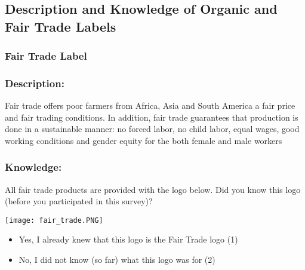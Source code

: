 \documentclass[sustainability,article,accept,moreauthors,pdftex,10pt,a4paper]{Definitions/mdpi}
\theoremstyle{mdpi}
\newcounter{ex}
\newcounter{re}
\theoremstyle{mdpidefinition}
\begin{document}
{
\appendix


\makeatletter
{}
\renewcommand{\thetable}{A\@arabic\c@table}
\setcounter{table}{0}
\renewcommand{\thefigure}{A\@arabic\c@figure}
\setcounter{figure}{0}
\makeatother
\section{\label{aaa}}
\subsection{Description and Knowledge of Organic and Fair Trade Labels }  %
\unskip
{}
\subsubsection{Fair Trade Label}
\unskip
\subsubsection*{Description:}
\par{Fair trade offers poor farmers from Africa, Asia and South America a fair price and fair trading conditions. In addition, fair trade guarantees that production is done in a sustainable manner: no forced labor, no child labor, equal wages, good working conditions and gender equity for the both female and male workers}
\subsubsection*{Knowledge:}
\par{All fair trade products are provided with the logo below. Did you know this logo (before you participated in this survey)?

\begin{minipage}{0.5\textwidth}
\begin{centering}
\texttt{[image: fair\_trade.PNG]}
\end{centering}
\end{minipage}

\begin{itemize}
\item Yes, I already knew that this logo is the Fair Trade logo (1)
\item No, I did not know (so far) what this logo was for (2)
\end{itemize}
}
}
\end{document}
